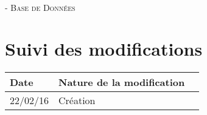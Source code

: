 \documentclass[asi, sansVersion]{picInsa}
\begin{document}
	\begin{center}
		\LARGE
		\textsc{
			\FF{}\\
			 - Base de Données
		}
	\end{center}
	\vspace{0.5cm}

	\section*{Suivi des modifications}
		\begin{table}[H]
			\centering
			\begin{tabularx}{18cm}{|p{1.7cm}|X|p{4cm}|}
				\hline
				\rowcolor[gray]{0.90} Date & Nature de la modification \\
				\hline
				
				22/02/16 & Création \\
				\hline
			\end{tabularx}
		\end{table}
\end{document}
